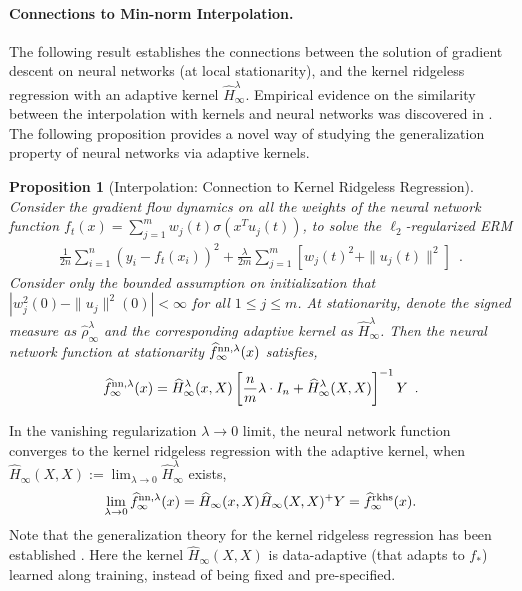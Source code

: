 \documentclass[11pt]{article}
\numberwithin{equation}{section}
\newtheorem{proposition}{Proposition}[section]
\begin{document}
\paragraph{Connections to Min-norm Interpolation.}

The following result establishes the connections between the solution of gradient descent on neural networks (at local stationarity), and the kernel ridgeless regression \citep{belkin2018understand, liang2018just, hastie2019surprises} with an adaptive kernel $\widehat{H}^{\lambda}_{\infty}$. Empirical evidence on the similarity between the interpolation with kernels and neural networks was discovered in \cite{belkin2018understand}. The following proposition provides a novel way of studying the generalization property of neural networks via adaptive kernels.


\begin{proposition}[Interpolation: Connection to Kernel Ridgeless Regression]
    \label{prop:interpolation}
    Consider the gradient flow dynamics on all the weights of the neural network function $f_t(x) = \sum_{j=1}^m w_j(t) \sigma(x^T u_j(t))$, to solve the $\ell_2$-regularized ERM
    \begin{align*}
        \frac{1}{2n} \sum_{i=1}^n (y_i - f_t(x_i))^2 + \frac{\lambda}{2m} \sum_{j=1}^m \left[ w_j(t)^2 + \| u_j(t) \|^2 \right] \enspace.
    \end{align*}
    Consider only the bounded assumption on initialization that $|w_j^2(0) - \|u_j\|^2(0)| <\infty$ for all $1\leq j\leq m$.
    At stationarity, denote the signed measure as $\widehat{\rho}^{\lambda}_{\infty}$ and the corresponding adaptive kernel as $\widehat{H}_{\infty}^{\lambda}$.
    Then the neural network function at stationarity $\widehat{f}^{{\rm nn}, \lambda}_{\infty} (x)$ satisfies, 
    \begin{align*}
        \widehat{f}^{{\rm nn}, \lambda}_{\infty} (x) = \widehat{H}_{\infty}^{\lambda}(x, X) \left[ \frac{n}{m} \lambda \cdot I_n + \widehat{H}_{\infty}^{\lambda}(X, X) \right]^{-1} Y \enspace.
    \end{align*}
\end{proposition}

In the vanishing regularization $\lambda \rightarrow 0$ limit, the neural network function converges to the kernel ridgeless regression with the adaptive kernel, when $\widehat{H}_{\infty}(X, X) := \lim_{\lambda \rightarrow 0} \widehat{H}_{\infty}^{\lambda}$ exists,
\begin{align*}
     \lim_{\lambda \rightarrow 0} \widehat{f}^{{\rm nn}, \lambda}_{\infty} (x) = \widehat{H}_{\infty}(x, X) \widehat{H}_{\infty}(X, X)^{+} Y = \widehat{f}^{\rm rkhs}_{\infty}(x).
\end{align*}
Note that the generalization theory for the kernel ridgeless regression has been established \cite{liang2018just, hastie2019surprises}. Here the kernel $\widehat{H}_{\infty}(X, X)$ is data-adaptive (that adapts to $f_*$) learned along training, instead of being fixed and pre-specified. 
\end{document}
